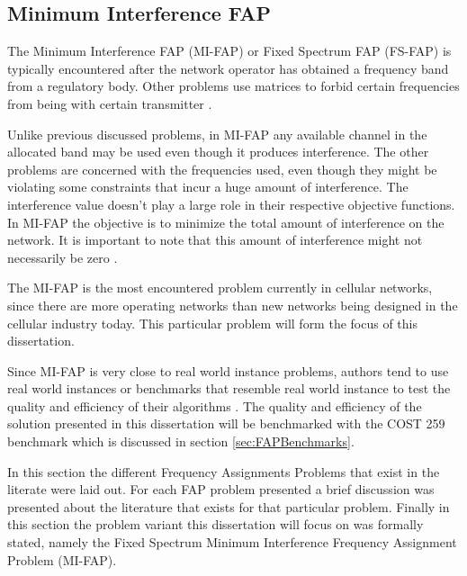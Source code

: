\subsection{Minimum Interference FAP}
The Minimum Interference FAP (MI-FAP) or Fixed Spectrum FAP (FS-FAP) is typically encountered after the network operator has obtained a frequency band from a regulatory body. Other problems use matrices to forbid certain frequencies from being with certain transmitter \cite{Karen2004,Eisenblatter,MontemanniThesis,MultipleBinaryFAP}. 

Unlike previous discussed problems, in MI-FAP any available channel in the allocated band may be used even though it produces interference. The other problems are concerned with the frequencies used, even though they might be violating some constraints that incur a huge amount of interference\cite{Karen2004,Eisenblatter,MontemanniThesis,MultipleBinaryFAP}. The interference value doesn't play a large role in their respective objective functions\cite{Karen2004,Eisenblatter,MontemanniThesis,MultipleBinaryFAP}. In MI-FAP the objective is to minimize the total amount of interference on the network. It is important to note that this amount of interference might not necessarily be zero \cite{Karen2004,Eisenblatter,MontemanniThesis,MultipleBinaryFAP}.

The MI-FAP is the most encountered problem currently in cellular networks, since there are more operating networks than new networks being designed in the cellular industry today. This particular problem will form the focus of this dissertation. 

Since MI-FAP is very close to real world instance problems, authors tend to use real world instances or benchmarks that resemble real world instance to test the quality and efficiency of their algorithms \cite{Karen2004,Eisenblatter,MontemanniThesis,MultipleBinaryFAP}. The quality and efficiency of the solution presented in this dissertation will be benchmarked with the COST 259 benchmark which is discussed in section \ref{sec:FAPBenchmarks}.

In this section the different Frequency Assignments Problems that exist in the literate were laid out. For each FAP problem presented a brief discussion was presented about the literature that exists for that particular problem. Finally in this section the problem variant this dissertation will focus on was formally stated, namely the Fixed Spectrum Minimum Interference Frequency Assignment Problem (MI-FAP). 

